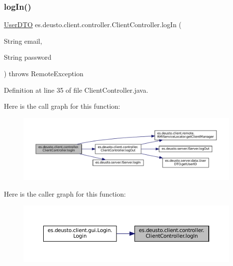 \subsubsection{\texorpdfstring{logIn()}{logIn()}}
{\footnotesize\ttfamily \mbox{\hyperlink{classes_1_1deusto_1_1server_1_1data_1_1_user_d_t_o}{User\+D\+TO}} es.\+deusto.\+client.\+controller.\+Client\+Controller.\+log\+In (\begin{DoxyParamCaption}\item[{String}]{email,  }\item[{String}]{password }\end{DoxyParamCaption}) throws Remote\+Exception}



Definition at line 35 of file Client\+Controller.\+java.

Here is the call graph for this function\+:
\nopagebreak
\begin{figure}[H]
\begin{center}
\leavevmode
\includegraphics[width=350pt]{classes_1_1deusto_1_1client_1_1controller_1_1_client_controller_a075c2e627be920454324dacbbc72295c_cgraph}
\end{center}
\end{figure}
Here is the caller graph for this function\+:
\nopagebreak
\begin{figure}[H]
\begin{center}
\leavevmode
\includegraphics[width=350pt]{classes_1_1deusto_1_1client_1_1controller_1_1_client_controller_a075c2e627be920454324dacbbc72295c_icgraph}
\end{center}
\end{figure}
\mbox{\label{classes_1_1deusto_1_1client_1_1controller_1_1_client_controller_a9379da9c24d71d3ebafaa44e0f858340}} 
